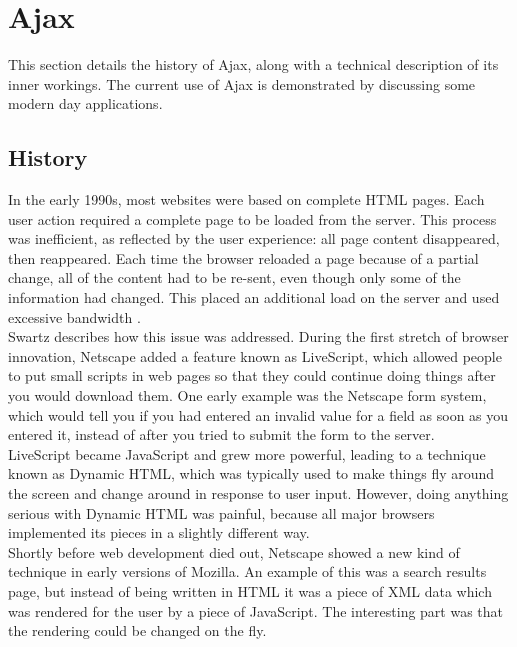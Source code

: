 \section{Ajax}
\label{sec:ajax}
This section details the history of Ajax, along with a technical description of its inner workings. The current use of Ajax is demonstrated by discussing some modern day applications.
	
\subsection{History}
In the early 1990s, most websites were based on complete HTML pages. Each user action required a complete page to be loaded from the server. This process was inefficient, as reflected by the user experience: all page content disappeared, then reappeared. Each time the browser reloaded a page because of a partial change, all of the content had to be re-sent, even though only some of the information had changed. This placed an additional load on the server and used excessive bandwidth \cite{garrett2005ajax}.\\

Swartz \cite{swartz2005brief} describes how this issue was addressed. During the first stretch of browser innovation, Netscape added a feature known as LiveScript, which allowed people to put small scripts in web pages so that they could continue doing things after you would download them. One early example was the Netscape form system, which would tell you if you had entered an invalid value for a field as soon as you entered it, instead of after you tried to submit the form to the server.\\

LiveScript became JavaScript and grew more powerful, leading to a technique known as Dynamic HTML, which was typically used to make things fly around the screen and change around in response to user input. However, doing anything serious with Dynamic HTML was painful, because all major browsers implemented its pieces in a slightly different way.\\

Shortly before web development died out, Netscape showed a new kind of technique in early versions of Mozilla. An example of this was a search results page, but instead of being written in HTML it was a piece of XML data which was rendered for the user by a piece of JavaScript. The interesting part was that the rendering could be changed on the fly.\\

